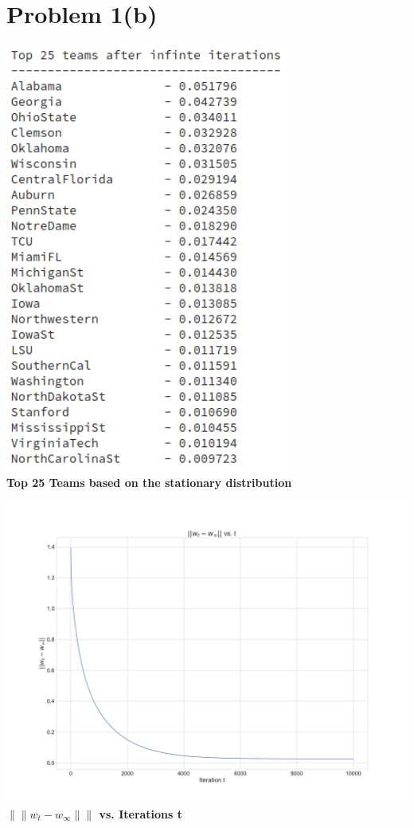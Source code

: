 \documentclass[openany,11pt]{homework}
\begin{document}
\section*{Problem 1(b)}
\begin{center}
	\centering
	\includegraphics[width = 0.70\textwidth]{1b-inf.png}
	\\
	\textbf{Top 25 Teams based on the stationary distribution}
\end{center}

\begin{center}
	\centering
	\includegraphics[width = \textwidth]{1a.png}
	\textbf{$\|\|w_t - w_{\infty}\|\|$ vs. Iterations t}
\end{center}
\end{document}

